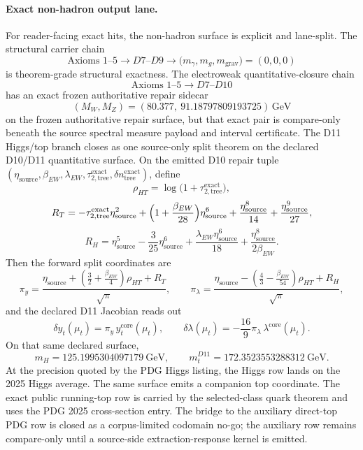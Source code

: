 \documentclass[11pt]{article}
\begin{document}
\paragraph{Exact non-hadron output lane.}
For reader-facing exact hits, the non-hadron surface is explicit and lane-split. The structural carrier chain
\[
\text{Axioms }1\text{--}5 \longrightarrow D7\text{--}D9 \longrightarrow
\bigl(m_\gamma,m_g,m_{\mathrm{grav}}\bigr)=(0,0,0)
\]
is theorem-grade structural exactness. The electroweak quantitative-closure chain
\[
\text{Axioms }1\text{--}5 \longrightarrow D7\text{--}D10
\]
has an exact frozen authoritative repair sidecar
\[
(M_W,M_Z)=
(80.377,\ 91.18797809193725)\,\mathrm{GeV}
\]
on the frozen authoritative repair surface, but that exact pair is compare-only beneath the source spectral measure payload and interval certificate. The D11 Higgs/top branch closes as one source-only split theorem on the declared D10/D11 quantitative surface. On the emitted D10 repair tuple \((\eta_{\mathrm{source}},\beta_{EW},\lambda_{EW},\tau_{2,\mathrm{tree}}^{\mathrm{exact}},\delta n_{\mathrm{tree}}^{\mathrm{exact}})\), define
\[
\rho_{HT}=\log\!\bigl(1+\tau_{2,\mathrm{tree}}^{\mathrm{exact}}\bigr),
\]
\[
R_T=
-\tau_{2,\mathrm{tree}}^{\mathrm{exact}}\eta_{\mathrm{source}}^2
+\Bigl(1+\frac{\beta_{EW}}{28}\Bigr)\eta_{\mathrm{source}}^6
+\frac{\eta_{\mathrm{source}}^8}{14}
+\frac{\eta_{\mathrm{source}}^9}{27},
\]
\[
R_H=
\eta_{\mathrm{source}}^5
-\frac{3}{25}\eta_{\mathrm{source}}^6
+\frac{\lambda_{EW}\eta_{\mathrm{source}}^6}{18}
+\frac{\eta_{\mathrm{source}}^8}{2\beta_{EW}}.
\]
Then the forward split coordinates are
\[
\pi_y=
\frac{\eta_{\mathrm{source}}+\left(\frac32+\frac{\beta_{EW}}4\right)\rho_{HT}+R_T}{\sqrt{\pi}},
\qquad
\pi_\lambda=
\frac{\eta_{\mathrm{source}}-\left(\frac43-\frac{\beta_{EW}}{54}\right)\rho_{HT}+R_H}{\sqrt{\pi}},
\]
and the declared D11 Jacobian reads out
\[
\delta y_t(\mu_t)=\pi_y\,y_t^{\mathrm{core}}(\mu_t),
\qquad
\delta\lambda(\mu_t)=-\frac{16}{9}\pi_\lambda\,\lambda^{\mathrm{core}}(\mu_t).
\]
On that same declared surface,
\[
m_H=125.1995304097179~\mathrm{GeV},
\qquad
m_t^{D11}=172.3523553288312~\mathrm{GeV}.
\]
At the precision quoted by the PDG Higgs listing, the Higgs row lands on the 2025 Higgs average. The
same surface emits a companion top coordinate. The exact public running-top row is carried by the
selected-class quark theorem and uses the PDG 2025 cross-section entry. The bridge to the auxiliary
direct-top PDG row is closed as a corpus-limited codomain no-go; the auxiliary row remains compare-only
until a source-side extraction-response kernel is emitted.
\end{document}
